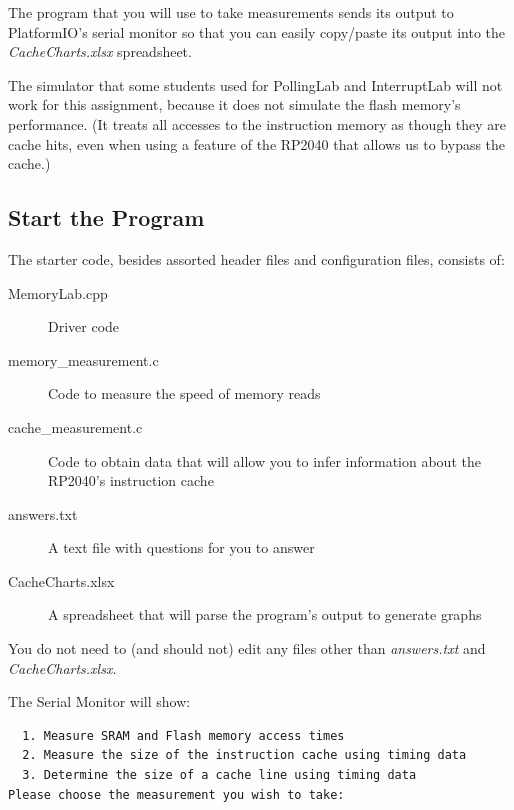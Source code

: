 The program that you will use to take measurements sends its output to PlatformIO's serial monitor so that you can easily copy/paste its output into the \textit{CacheCharts.xlsx} spreadsheet.

The simulator that some students used for PollingLab and InterruptLab will not work for this assignment, because it does not simulate the flash memory's performance.
(It treats all accesses to the instruction memory as though they are cache hits, even when using a feature of the RP2040 that allows us to bypass the cache.)



\subsection{Start the Program}

The starter code, besides assorted header files and configuration files, consists of:
\begin{description}
    \item[MemoryLab.cpp] Driver code
    \item[memory\_measurement.c] Code to measure the speed of memory reads
    \item[cache\_measurement.c] Code to obtain data that will allow you to infer information about the RP2040's instruction cache
    \item[answers.txt] A text file with questions for you to answer
    \item[CacheCharts.xlsx] A spreadsheet that will parse the program's output to generate graphs
\end{description}

You do not need to (and should not) edit any files other than \textit{answers.txt} and \textit{CacheCharts.xlsx}.

\begin{description}
\end{description}

The Serial Monitor will show:

\begin{verbatim}
  1. Measure SRAM and Flash memory access times
  2. Measure the size of the instruction cache using timing data
  3. Determine the size of a cache line using timing data
Please choose the measurement you wish to take:
\end{verbatim}

